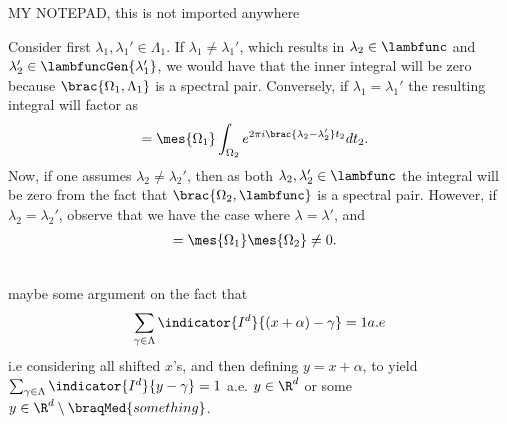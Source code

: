 


MY NOTEPAD, this is not imported anywhere


Consider first $\lambda_1, \lambda_1' \in \Lambda_1$. If $\lambda_1 \neq \lambda_1'$, which results in $\lambda_2\in \lambfunc$ and $\lambda_2'\in \lambfuncGen{\lambda_1'}$, we would have that the inner integral will be zero because $\brac{\Omega_1, \Lambda_1}$ is a spectral pair. Conversely, if $\lambda_1 = \lambda_1'$ the resulting integral will factor as %
\begin{align*}
    &= \mes{\Omega_1} \int_{\Omega_2} e^{2\pi i  \brac{\lambda_2- \lambda_2'}t_2} dt_2.
\end{align*}
Now, if one assumes $\lambda_2 \neq \lambda_2'$, then as both $\lambda_2, \lambda_2' \in \lambfunc$ the integral will be zero from the fact that $\brac{\Omega_2, \lambfunc}$ is a spectral pair. However, if $\lambda_2 = \lambda_2'$, observe that we have the case where $\lambda = \lambda'$, and
\begin{align*}
    &= \mes{\Omega_1}\mes{\Omega_2} \neq 0.
\end{align*}


\\
maybe some argument on the fact that 
\begin{align*}
    \sum_{\gamma \in \Lambda} \indicator{I^d}{(x+\alpha) - \gamma} = 1 a.e 
\end{align*}
i.e considering all shifted $x$'s, and then defining $y=x+\alpha$, to yield $\sum_{\gamma \in \Lambda} \indicator{I^d}{y - \gamma} = 1$ a.e. $y\in \R^d$ or some $y\in \R^d\setminus \braqMed{something}$. 

